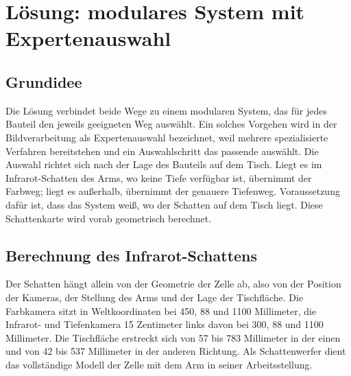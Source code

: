 \documentclass[oneside,studentpaper]{wbk}
\begin{document}
\chapter{Lösung: modulares System mit Expertenauswahl}
\label{ch:loesung}

\section{Grundidee}
\label{sec:loesung-idee}

Die Lösung verbindet beide Wege zu einem modularen System, das für jedes Bauteil
den jeweils geeigneten Weg auswählt. Ein solches Vorgehen wird in der
Bildverarbeitung als Expertenauswahl bezeichnet, weil mehrere spezialisierte
Verfahren bereitstehen und ein Auswahlschritt das passende auswählt. Die Auswahl
richtet sich nach der Lage des Bauteils auf dem Tisch. Liegt es im
Infrarot-Schatten des Arms, wo keine Tiefe verfügbar ist, übernimmt der Farbweg;
liegt es außerhalb, übernimmt der genauere Tiefenweg. Voraussetzung dafür ist,
dass das System weiß, wo der Schatten auf dem Tisch liegt. Diese Schattenkarte
wird vorab geometrisch berechnet.

\section{Berechnung des Infrarot-Schattens}
\label{sec:raytracing}

Der Schatten hängt allein von der Geometrie der Zelle ab, also von der Position
der Kameras, der Stellung des Arms und der Lage der Tischfläche. Die Farbkamera
sitzt in Weltkoordinaten bei 450, 88 und 1100 Millimeter, die Infrarot- und
Tiefenkamera 15 Zentimeter links davon bei 300, 88 und 1100 Millimeter. Die
Tischfläche erstreckt sich von 57 bis 783 Millimeter in der einen und von 42 bis
537 Millimeter in der anderen Richtung. Als Schattenwerfer dient das vollständige
Modell der Zelle mit dem Arm in seiner Arbeitsstellung.
\end{document}
